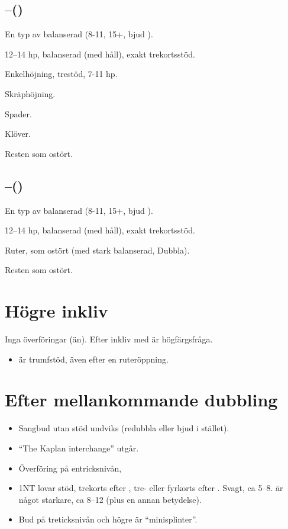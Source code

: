 \subsection{--()}

\bbe
\item[Dubbelt] En typ av balanserad (8-11, 15+, bjud ).
\item[\NT{1}] 12--14 hp, balanserad (med håll), exakt trekortsstöd.
\item[\kl{2}] Enkelhöjning, trestöd, 7-11 hp.
\item[\ru{2}] Skräphöjning.
\item[\hj{2}] Spader.
\item[\spa{2}] Klöver.  
   
\ebe
Resten som ostört.

\subsection{--()}

\bbe
\item[D] En typ av balanserad (8-11, 15+, bjud ).
\item[\NT{1}] 12--14 hp, balanserad (med håll), exakt trekortsstöd.
\item[\kl{2}] Ruter, som ostört (med stark balanserad, Dubbla).
\ebe

Resten som ostört.

\section{Högre inkliv}

Inga överföringar (än). Efter inkliv med  är  högfärgsfråga.

\begin{itemize}

\item {} är trumfstöd, även efter en ruteröppning.


\end{itemize}

\section{Efter mellankommande dubbling}

\begin{itemize}
\item Sangbud utan stöd undviks (redubbla eller bjud  i stället). 
\item ``The
Kaplan interchange'' utgår. 
\item Överföring på entricksnivån, 
\item 1NT lovar stöd, trekorts efter , tre- eller fyrkorts efter
  . Svagt, ca 5--8.  är något starkare, ca 8--12 (plus en
  annan betydelse).  
\item Bud på treticksnivån och högre är ``minisplinter''. 
\end{itemize}

